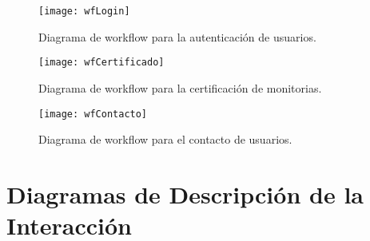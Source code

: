 \begin{figure}[H]
	\centering
	\texttt{[image: wfLogin]}
	\centering
	\caption{Diagrama de workflow para la autenticación de usuarios.}
	\label{fig:wfLogin}
\end{figure}

\begin{figure}[H]
	\centering
	\texttt{[image: wfCertificado]}
	\centering
	\caption{Diagrama de workflow para la certificación de monitorias.}
	\label{fig:wfCertificado}
\end{figure}
\clearpage
\begin{figure}[H]
	\centering
	\texttt{[image: wfContacto]}
	\centering
	\caption{Diagrama de workflow para el contacto de usuarios.}
	\label{fig:wfContacto}
\end{figure}

\newpage

\section{Diagramas de Descripción de la Interacción}

\newpage